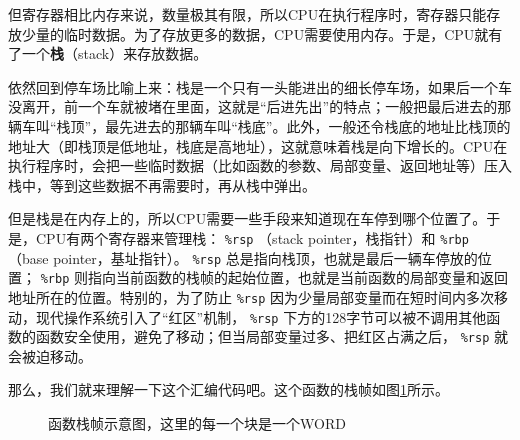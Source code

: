 但寄存器相比内存来说，数量极其有限，所以CPU在执行程序时，寄存器只能存放少量的临时数据。为了存放更多的数据，CPU需要使用内存。于是，CPU就有了一个\textbf{栈}（stack）来存放数据。

依然回到停车场比喻上来：栈是一个只有一头能进出的细长停车场，如果后一个车没离开，前一个车就被堵在里面，这就是“后进先出”的特点；一般把最后进去的那辆车叫“栈顶”，最先进去的那辆车叫“栈底”。此外，一般还令栈底的地址比栈顶的地址大（即栈顶是低地址，栈底是高地址），这就意味着栈是向下增长的。CPU在执行程序时，会把一些临时数据（比如函数的参数、局部变量、返回地址等）压入栈中，等到这些数据不再需要时，再从栈中弹出。

但是栈是在内存上的，所以CPU需要一些手段来知道现在车停到哪个位置了。于是，CPU有两个寄存器来管理栈： \verb|%rsp| （stack pointer，栈指针）和 \verb|%rbp| （base pointer，基址指针）。 \verb|%rsp| 总是指向栈顶，也就是最后一辆车停放的位置； \verb|%rbp| 则指向当前函数的栈帧的起始位置，也就是当前函数的局部变量和返回地址所在的位置。特别的，为了防止 \verb|%rsp| 因为少量局部变量而在短时间内多次移动，现代操作系统引入了“红区”机制， \verb|%rsp| 下方的128字节可以被不调用其他函数的函数安全使用，避免了移动；但当局部变量过多、把红区占满之后， \verb|%rsp| 就会被迫移动。

那么，我们就来理解一下这个汇编代码吧。这个函数的栈帧如图\ref{fig:function-stack}所示。
\begin{figure}
    \centering
    
    \caption{函数栈帧示意图，这里的每一个块是一个WORD}
    \label{fig:function-stack}
\end{figure}

